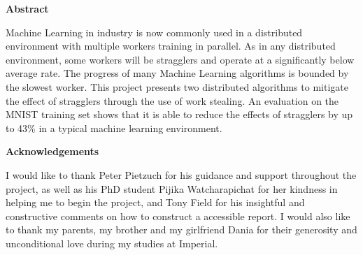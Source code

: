 \documentclass[12pt]{article}
\begin{document}
\begin{titlepage}



 

\vfill %

\end{titlepage}

\clearpage\thispagestyle{empty}\addtocounter{page}{-1} 
\newpage \phantom{a}
\clearpage\thispagestyle{empty}\addtocounter{page}{-1} 
\newpage \phantom{a}

\vspace*{\fill}
\centerline{\large{\textbf{Abstract}}}
Machine Learning in industry is now commonly used in a distributed environment with multiple workers training in parallel. As in any distributed environment, some workers will be stragglers and  operate at a significantly below average rate. The progress of many Machine Learning algorithms is bounded by the slowest worker. This project presents two distributed algorithms to mitigate the effect of stragglers through the use of work stealing. An evaluation on the MNIST training set shows that it is able to reduce the effects of stragglers by up to 43\% in a typical machine learning environment.
\vspace*{\fill}

\clearpage\thispagestyle{empty}\addtocounter{page}{-1} 
\newpage \phantom{a}
\clearpage\thispagestyle{empty}\addtocounter{page}{-1} 
\newpage \phantom{a}

\vspace*{\fill}
\centerline{\large{\textbf{Acknowledgements}}}
I would like to thank Peter Pietzuch for his guidance and support throughout the project, as well as his PhD student Pijika Watcharapichat for her kindness in helping me to begin the project, and Tony Field for his insightful and constructive comments on how to construct a accessible report.
I would also like to thank my parents, my brother and my girlfriend Dania for their generosity and unconditional love during my studies at Imperial.
\vspace*{\fill}
\end{document}
